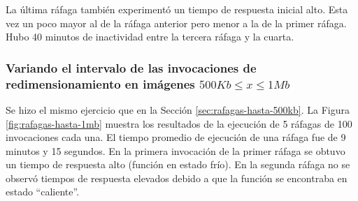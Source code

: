 La última ráfaga también experimentó un tiempo de respuesta inicial alto. Esta vez un poco mayor al de la ráfaga anterior pero menor a la de la primer ráfaga. Hubo 40 minutos de inactividad entre la tercera ráfaga y la cuarta. 

\subsubsection{Variando el intervalo de las invocaciones de redimensionamiento en imágenes $500Kb \leq x \leq 1Mb$}

Se hizo el mismo ejercicio que en la Sección \ref{sec:rafagas-hasta-500kb}. La Figura \ref{fig:rafagas-hasta-1mb} muestra los resultados de la ejecución de 5 ráfagas de 100 invocaciones cada una. El tiempo promedio de ejecución de una ráfaga fue de 9 minutos y 15 segundos. En la primera invocación de la primer ráfaga se obtuvo un tiempo de respuesta alto (función en estado frío). En la segunda ráfaga no se observó tiempos de respuesta elevados debido a que la función se encontraba en estado ``caliente''. 

